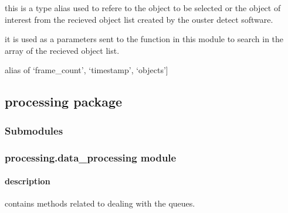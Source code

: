 \documentclass[letterpaper,10pt,english]{sphinxmanual}
\begin{document}

\begin{fulllineitems}
\label{\detokenize{utilities:utilities.utilities.rootinfo_key}}
\pysigstartsignatures
{}
\pysigstopsignatures\begin{description}
\sphinxAtStartPar
this is a type alias used to refere to the object to be selected or the object
of interest from the recieved object list created by the ouster detect software.

\sphinxAtStartPar
it is used as a parameters sent to the function in this module to search in
the array of the recieved object list.

\end{description}

\sphinxAtStartPar
alias of \sphinxcode{\sphinxupquote{Literal}}{[}‘frame\_count’, ‘timestamp’, ‘objects’{]}

\end{fulllineitems}


\sphinxstepscope


\subsection{processing package}
\label{\detokenize{processing:processing-package}}\label{\detokenize{processing::doc}}

\subsubsection{Submodules}
\label{\detokenize{processing:submodules}}\begin{quote}

\sphinxAtStartPar
{}          
\end{quote}


\subsubsection{processing.data\_processing module}
\label{\detokenize{processing:processing-data-processing-module}}

\paragraph{description}
\label{\detokenize{processing:description}}
\sphinxAtStartPar
contains methods related to dealing with the queues.
\label{\detokenize{processing:processing-data-ref}}\label{\detokenize{processing:module-processing.data_processing}}
\end{document}
